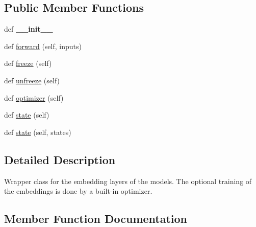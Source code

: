 \subsection*{Public Member Functions}
\begin{DoxyCompactItemize}
\item 
def {\bfseries \+\_\+\+\_\+init\+\_\+\+\_\+}\hypertarget{classutils_1_1Embedding_a5022555fe31ce2e41e72c466362a3c01}{}\label{classutils_1_1Embedding_a5022555fe31ce2e41e72c466362a3c01}

\item 
def \hyperlink{classutils_1_1Embedding_ac21374958141a3f27191d873b107edf5}{forward} (self, inputs)
\item 
def \hyperlink{classutils_1_1Embedding_a7726f478edc24c481f103d71e92e1bf2}{freeze} (self)
\item 
def \hyperlink{classutils_1_1Embedding_afd03315bbaada52bbf08dd34a3353693}{unfreeze} (self)
\item 
def \hyperlink{classutils_1_1Embedding_a6e89544aab0d191a209558c5d93bd79f}{optimizer} (self)
\item 
def \hyperlink{classutils_1_1Embedding_a1a6284d9ed1ebba9515448b194d1c47f}{state} (self)
\item 
def \hyperlink{classutils_1_1Embedding_a68b81dd7e2446c7b7a7d17d9eb2c7f80}{state} (self, states)
\end{DoxyCompactItemize}


\subsection{Detailed Description}
\begin{DoxyVerb}Wrapper class for the embedding layers of the models. The optional training of the embeddings
is done by a built-in optimizer.
\end{DoxyVerb}
 

\subsection{Member Function Documentation}
